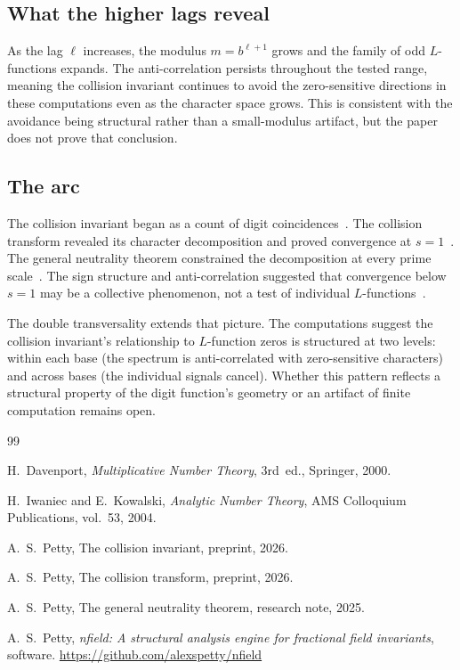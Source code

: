 \documentclass[12pt]{amsart}
\theoremstyle{definition}
\theoremstyle{remark}
\begin{document}
\subsection*{What the higher lags reveal}

As the lag $\ell$ increases, the modulus
$m = b^{\ell+1}$ grows and the family of odd
$L$-functions expands. The anti-correlation persists
throughout the tested range, meaning the collision
invariant continues to avoid the zero-sensitive
directions in these computations even as the character
space grows. This is consistent with the avoidance
being structural rather than a small-modulus artifact,
but the paper does not prove that conclusion.

\subsection*{The arc}

The collision invariant began as a count of digit
coincidences~\cite{paperA}. The collision transform
revealed its character decomposition and proved
convergence at $s = 1$~\cite{paperB}. The general
neutrality theorem constrained the decomposition at
every prime scale~\cite{paper19}. The sign structure
and anti-correlation suggested that convergence below
$s = 1$ may be a collective phenomenon, not a test of
individual $L$-functions~\cite{paper19}.

The double transversality extends that picture. The
computations suggest the collision invariant's
relationship to $L$-function zeros is structured at
two levels: within each base (the spectrum is
anti-correlated with zero-sensitive characters) and
across bases (the individual signals cancel).
Whether this pattern reflects a structural property
of the digit function's geometry or an artifact of
finite computation remains open.

\begin{thebibliography}{99}

H.~Davenport,
\emph{Multiplicative Number Theory},
3rd~ed., Springer, 2000.

H.~Iwaniec and E.~Kowalski,
\emph{Analytic Number Theory},
AMS Colloquium Publications, vol.~53, 2004.

A.~S.~Petty,
The collision invariant,
preprint, 2026.

A.~S.~Petty,
The collision transform,
preprint, 2026.

A.~S.~Petty,
The general neutrality theorem,
research note, 2025.

A.~S.~Petty,
\emph{nfield: A structural analysis engine for fractional
field invariants},
software.
\url{https://github.com/alexspetty/nfield}

\end{thebibliography}
\end{document}
